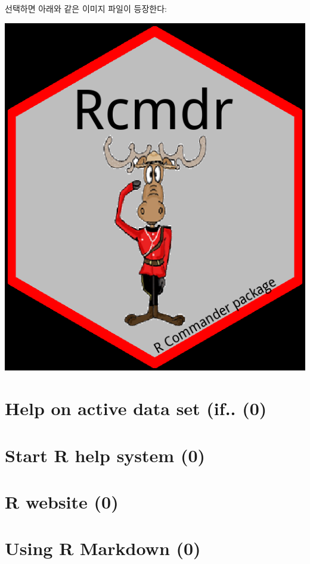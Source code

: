 \documentclass[
]{book}
\begin{document}
선택하면 아래와 같은 이미지 파일이 등장한다:

\includegraphics{fig/help-02.png}

\hypertarget{help-on-active-data-set-if..-0}{%
\section{Help on active data set (if.. (0)}\label{help-on-active-data-set-if..-0}}

\hypertarget{start-r-help-system-0}{%
\section{Start R help system (0)}\label{start-r-help-system-0}}

\hypertarget{r-website-0}{%
\section{R website (0)}\label{r-website-0}}

\hypertarget{using-r-markdown-0}{%
\section{Using R Markdown (0)}\label{using-r-markdown-0}}
\end{document}

